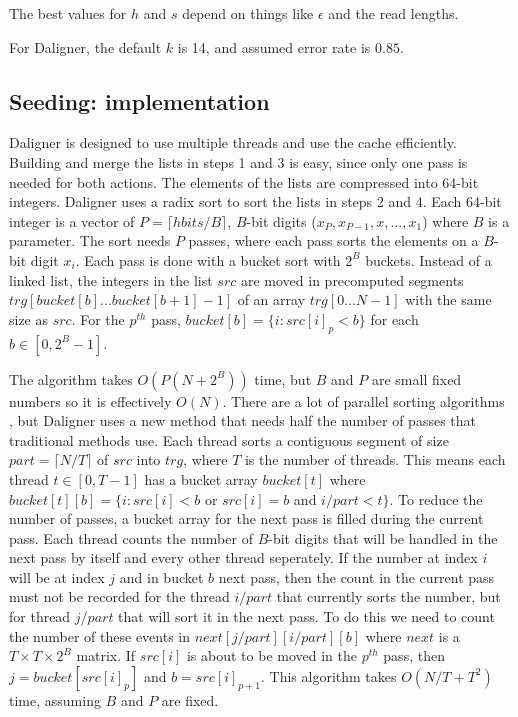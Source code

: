 \documentclass[../main/thesis.tex]{subfiles}
\begin{document}

The best values for $h$ and $s$ depend on things like $\epsilon$ and the read lengths.

For Daligner, the default $k$ is 14, and assumed error rate is $0.85$.



\subsection{Seeding: implementation}
Daligner is designed to use multiple threads and use the cache efficiently.
Building and merge the lists in steps 1 and 3 is easy, since only one pass is needed for both actions.
The elements of the lists are compressed into 64-bit integers.
Daligner uses a radix sort \cite{sorting}\cite{radix} to sort the lists in steps 2 and 4.
Each 64-bit integer is a vector of $P=\lceil hbits/B\rceil$, $B$-bit digits ($x_P,x_{P-1},x,...,x_1$) where $B$ is a parameter.
The sort needs $P$ passes, where each pass sorts the elements on a $B$-bit digit $x_i$.
Each pass is done with a bucket sort \cite{sorting} with $2^B$ buckets.
Instead of a linked list, the integers in the list $src$ are moved in precomputed segments $trg[bucket[b]...bucket[b+1]-1]$ of an array $trg[0...N-1]$ with the same size as $src$.
For the $p^{th}$ pass, $bucket[b] = \{i: src[i]_p < b\}$ for each $b \in [0,2^B-1]$.



The algorithm takes $O(P(N+2^B))$ time, but $B$ and $P$ are small fixed numbers so it is effectively $O(N)$.
There are a lot of parallel sorting algorithms \cite{parRadix1}\cite{parRadix2}, but Daligner uses a new method that needs half the number of passes that traditional methods use.
Each thread sorts a contiguous segment of size $part = \lceil N/T\rceil$ of $src$ into $trg$, where $T$ is the number of threads.
This means each thread $t \in [0,T-1]$ has a bucket array $bucket[t]$ where $bucket[t][b] = \{i: src[i] < b$ or $src[i] = b$ and $i/part < t\}$.
To reduce the number of passes, a bucket array for the next pass is filled during the current pass.
Each thread counts the number of $B$-bit digits that will be handled in the next pass by itself and every other thread seperately.
If the number at index $i$ will be at index $j$ and in bucket $b$ next pass, then the count in the current pass must not be recorded for the thread $i/part$ that currently sorts the number, but for thread $j/part$ that will sort it in the next pass.
To do this we need to count the number of these events in $next[j/part][i/part][b]$ where $next$ is a $T\times T\times 2^B$ matrix.
If $src[i]$ is about to be moved in the $p^{th}$ pass, then $j = bucket[src[i]_p]$ and $b = src[i]_{p+1}$.
This algorithm takes $O(N/T+T^2)$ time, assuming $B$ and $P$ are fixed.
\end{document}
